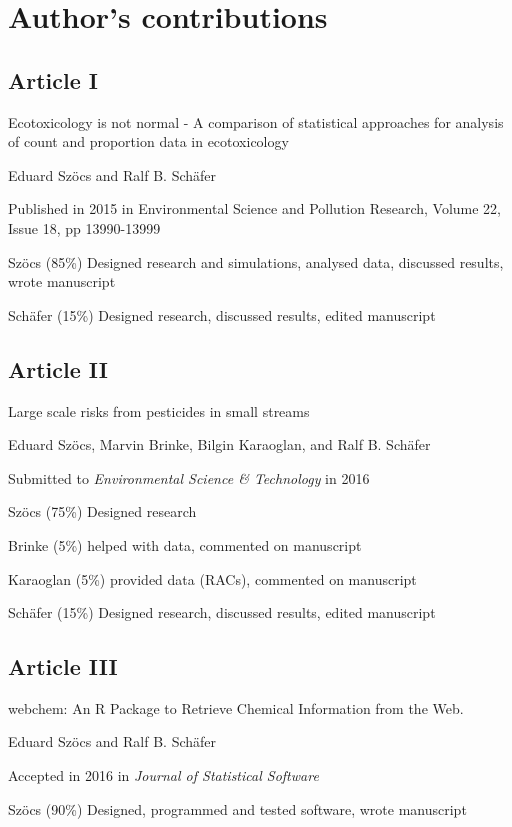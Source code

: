 \chapter{Author's contributions}

\begin{sloppypar}
\section*{Article I}
\small
\begin{description}
    \setlength\itemsep{0.3em}
	\item[Title:] Ecotoxicology is not normal - A comparison of statistical approaches for analysis of count and proportion data in ecotoxicology
	\item[Authors:] Eduard Szöcs and Ralf B. Schäfer
	\item[Status:] Published in 2015 in Environmental Science and Pollution Research, Volume 22, Issue 18, pp 13990-13999
	\item[Contributions:] Szöcs (85\%) Designed research and simulations, analysed data, discussed results, wrote manuscript 

	Schäfer (15\%) Designed research, discussed results, edited manuscript
\end{description}
\normalsize


\section*{Article II}
\small
\begin{description}
    \setlength\itemsep{0.3em}
	\item[Title:] Large scale risks from pesticides in small streams
	\item[Authors:] Eduard Szöcs, Marvin Brinke, Bilgin Karaoglan, and Ralf B. Schäfer
	\item[Status:] Submitted to \emph{Environmental Science \& Technology} in 2016
	\item[Contributions:] Szöcs (75\%) Designed research

	Brinke (5\%) helped with data, commented on manuscript

	Karaoglan (5\%) provided data (RACs), commented on manuscript

	Schäfer (15\%) Designed research, discussed results, edited manuscript
\end{description}
\normalsize


\section*{Article III}
\small
\begin{description}
    \setlength\itemsep{0.3em}
	\item[Title:] webchem: An R Package to Retrieve Chemical Information from the Web.
	\item[Authors:] Eduard Szöcs and Ralf B. Schäfer
	\item[Status:] Accepted in 2016 in \emph{Journal of Statistical Software}
	\item[Contributions:] Szöcs (90\%) Designed, programmed and tested software, wrote manuscript


\end{description}
\end{sloppypar}
